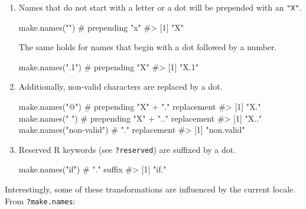 \documentclass[
]{krantz}
\makeatletter
\newenvironment{Shaded}{\begin{snugshade}}{\end{snugshade}}
\newcommand{\CommentTok}[1]{\textcolor[rgb]{0.56,0.35,0.01}{\textit{#1}}}
\newcommand{\KeywordTok}[1]{\textcolor[rgb]{0.13,0.29,0.53}{\textbf{#1}}}
\newcommand{\NormalTok}[1]{#1}
\newcommand{\StringTok}[1]{\textcolor[rgb]{0.31,0.60,0.02}{#1}}
\newenvironment{kframe}{%
\medskip{}
\setlength{\fboxsep}{.8em}
 \def\at@end@of@kframe{}%
 \ifinner\ifhmode%
  \def\at@end@of@kframe{\end{minipage}}%
  \begin{minipage}{\columnwidth}%
 \fi\fi%
 \def\FrameCommand##1{\hskip\@totalleftmargin \hskip-\fboxsep
 \colorbox{shadecolor}{##1}\hskip-\fboxsep
     \hskip-\linewidth \hskip-\@totalleftmargin \hskip\columnwidth}%
 \MakeFramed {\advance\hsize-\width
   \@totalleftmargin\z@ \linewidth\hsize
   \@setminipage}}%
 {\par\unskip\endMakeFramed%
 \at@end@of@kframe}
\renewenvironment{Shaded}{\begin{kframe}}{\end{kframe}}
\renewcommand{\KeywordTok} [1]{\textcolor[rgb]{0.00,0.44,0.13}{{#1}}}
\renewcommand{\StringTok}  [1]{\textcolor[rgb]{0.25,0.44,0.63}{{#1}}}
\renewcommand{\CommentTok} [1]{\textcolor[rgb]{0.38,0.63,0.69}{{#1}}}
\renewcommand{\NormalTok}  [1]{{#1}}
\makeatother
\begin{document}
\begin{enumerate}
\def\labelenumi{\arabic{enumi}.}
\item
  Names that do not start with a letter or a dot will be prepended with an \texttt{"X"}.

\begin{Shaded}
\begin{Highlighting}[]
\KeywordTok{make.names}\NormalTok{(}\StringTok{""}\NormalTok{)    }\CommentTok{# prepending "x"}
\CommentTok{#> [1] "X"}
\end{Highlighting}
\end{Shaded}

  The same holds for names that begin with a dot followed by a number.

\begin{Shaded}
\begin{Highlighting}[]
\KeywordTok{make.names}\NormalTok{(}\StringTok{".1"}\NormalTok{)  }\CommentTok{# prepending "X"}
\CommentTok{#> [1] "X.1"}
\end{Highlighting}
\end{Shaded}
\item
  Additionally, non-valid characters are replaced by a dot.

\begin{Shaded}
\begin{Highlighting}[]
\KeywordTok{make.names}\NormalTok{(}\StringTok{"@"}\NormalTok{)          }\CommentTok{# prepending "X" + "." replacement }
\CommentTok{#> [1] "X."}
\KeywordTok{make.names}\NormalTok{(}\StringTok{"  "}\NormalTok{)         }\CommentTok{# prepending "X" + ".." replacement}
\CommentTok{#> [1] "X.."}
\KeywordTok{make.names}\NormalTok{(}\StringTok{"non-valid"}\NormalTok{)  }\CommentTok{# "." replacement}
\CommentTok{#> [1] "non.valid"}
\end{Highlighting}
\end{Shaded}
\item
  Reserved R keywords (see \texttt{?reserved}) are suffixed by a dot.

\begin{Shaded}
\begin{Highlighting}[]
\KeywordTok{make.names}\NormalTok{(}\StringTok{"if"}\NormalTok{)  }\CommentTok{# "." suffix}
\CommentTok{#> [1] "if."}
\end{Highlighting}
\end{Shaded}
\end{enumerate}

Interestingly, some of these transformations are influenced by the current locale. From \texttt{?make.names}:
\end{document}
